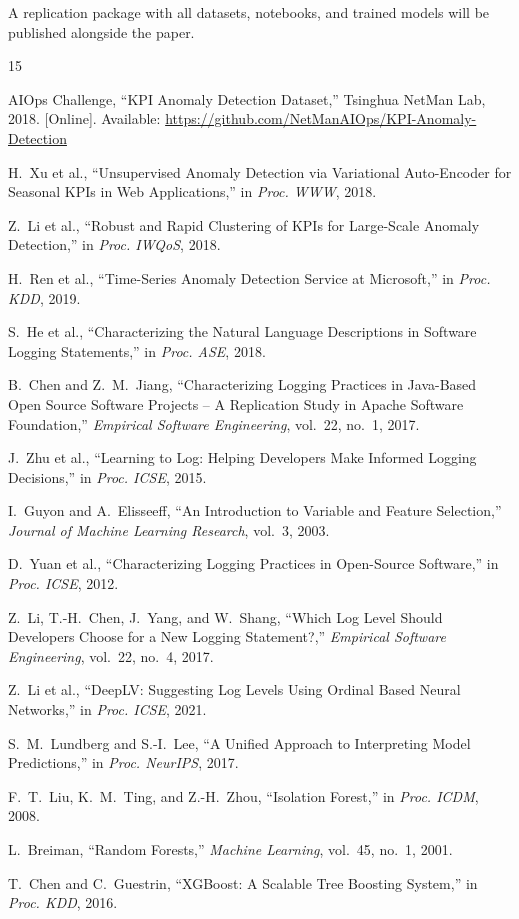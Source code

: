 \documentclass[10pt,twocolumn]{article}
\begin{document}
A replication package with all datasets, notebooks, and trained models will be published alongside the paper.


\begin{thebibliography}{15}

AIOps Challenge, ``KPI Anomaly Detection Dataset,'' Tsinghua NetMan Lab, 2018. [Online]. Available: \url{https://github.com/NetManAIOps/KPI-Anomaly-Detection}

H.~Xu et al., ``Unsupervised Anomaly Detection via Variational Auto-Encoder for Seasonal KPIs in Web Applications,'' in \emph{Proc. WWW}, 2018.

Z.~Li et al., ``Robust and Rapid Clustering of KPIs for Large-Scale Anomaly Detection,'' in \emph{Proc. IWQoS}, 2018.

H.~Ren et al., ``Time-Series Anomaly Detection Service at Microsoft,'' in \emph{Proc. KDD}, 2019.

S.~He et al., ``Characterizing the Natural Language Descriptions in Software Logging Statements,'' in \emph{Proc. ASE}, 2018.

B.~Chen and Z.~M.~Jiang, ``Characterizing Logging Practices in Java-Based Open Source Software Projects -- A Replication Study in Apache Software Foundation,'' \emph{Empirical Software Engineering}, vol.~22, no.~1, 2017.

J.~Zhu et al., ``Learning to Log: Helping Developers Make Informed Logging Decisions,'' in \emph{Proc. ICSE}, 2015.

I.~Guyon and A.~Elisseeff, ``An Introduction to Variable and Feature Selection,'' \emph{Journal of Machine Learning Research}, vol.~3, 2003.

D.~Yuan et al., ``Characterizing Logging Practices in Open-Source Software,'' in \emph{Proc. ICSE}, 2012.

Z.~Li, T.-H.~Chen, J.~Yang, and W.~Shang, ``Which Log Level Should Developers Choose for a New Logging Statement?,'' \emph{Empirical Software Engineering}, vol.~22, no.~4, 2017.

Z.~Li et al., ``DeepLV: Suggesting Log Levels Using Ordinal Based Neural Networks,'' in \emph{Proc. ICSE}, 2021.

S.~M.~Lundberg and S.-I.~Lee, ``A Unified Approach to Interpreting Model Predictions,'' in \emph{Proc. NeurIPS}, 2017.

F.~T.~Liu, K.~M.~Ting, and Z.-H.~Zhou, ``Isolation Forest,'' in \emph{Proc. ICDM}, 2008.

L.~Breiman, ``Random Forests,'' \emph{Machine Learning}, vol.~45, no.~1, 2001.

T.~Chen and C.~Guestrin, ``XGBoost: A Scalable Tree Boosting System,'' in \emph{Proc. KDD}, 2016.

\end{thebibliography}
\end{document}
